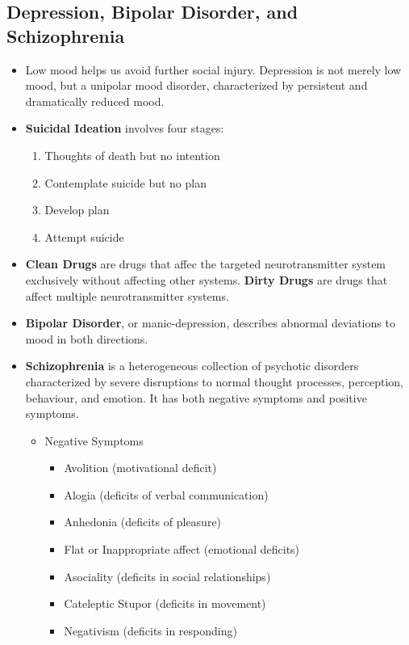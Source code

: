 \documentclass[10pt,letter]{article}
\theoremstyle{plain}
\theoremstyle{definition}
\begin{document}
\subsection*{Depression, Bipolar Disorder, and Schizophrenia}
\begin{itemize}
    \item Low mood helps us avoid further social injury. Depression is not merely low mood, but a unipolar mood disorder, characterized by persistent and dramatically reduced mood. 
    \item \textbf{Suicidal Ideation} involves four stages:\begin{enumerate}[label=Stage \arabic*)]
        \item Thoughts of death but no intention
        \item Contemplate suicide but no plan 
        \item Develop plan
        \item Attempt suicide
    \end{enumerate}
    \item \textbf{Clean Drugs} are drugs that affec the targeted neurotransmitter system exclusively without affecting other systems. \textbf{Dirty Drugs} are drugs that affect multiple neurotransmitter systems. 
    \item \textbf{Bipolar Disorder}, or manic-depression, describes abnormal deviations to mood in both directions.
    \item \textbf{Schizophrenia} is a heterogeneous collection of psychotic disorders characterized by severe disruptions to normal thought processes, perception, behaviour, and emotion. It has both negative symptoms and positive symptoms. \begin{itemize}
        \item Negative Symptoms \begin{itemize}
            \item Avolition (motivational deficit)
            \item Alogia (deficits of verbal communication)
            \item Anhedonia (deficits of pleasure)
            \item Flat or Inappropriate affect (emotional deficits)
            \item Asociality (deficits in social relationships)
            \item Cateleptic Stupor (deficits in movement)
            \item Negativism (deficits in responding)

\end{itemize}
\end{itemize}
\end{itemize}
\end{document}
